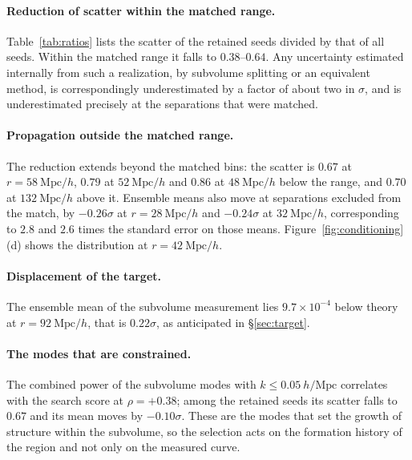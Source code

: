 \documentclass[12pt]{article}
\newcommand{\Mpch}{\ \mathrm{Mpc}/h}
\begin{document}
\paragraph{Reduction of scatter within the matched range.}
Table~\ref{tab:ratios} lists the scatter of the retained seeds divided by that
of all seeds.  Within the matched range it falls to $0.38$--$0.64$.  Any
uncertainty estimated internally from such a realization, by subvolume
splitting or an equivalent method, is correspondingly underestimated by a
factor of about two in $\sigma$, and is underestimated precisely at the
separations that were matched.

\paragraph{Propagation outside the matched range.}  The reduction extends
beyond the matched bins: the scatter is $0.67$ at $r = 58\Mpch$, $0.79$ at
$52\Mpch$ and $0.86$ at $48\Mpch$ below the range, and $0.70$ at $132\Mpch$
above it.  Ensemble means also move at separations excluded from the match, by
$-0.26\sigma$ at $r = 28\Mpch$ and $-0.24\sigma$ at $32\Mpch$, corresponding to
$2.8$ and $2.6$ times the standard error on those means.
Figure~\ref{fig:conditioning}(d) shows the distribution at $r = 42\Mpch$.

\paragraph{Displacement of the target.}  The ensemble mean of the subvolume
measurement lies $9.7\times10^{-4}$ below theory at $r = 92\Mpch$, that is
$0.22\sigma$, as anticipated in \S\ref{sec:target}.

\paragraph{The modes that are constrained.}  The combined power of the
subvolume modes with $k \leq 0.05\ h/\mathrm{Mpc}$ correlates with the search
score at $\rho = +0.38$; among the retained seeds its scatter falls to $0.67$
and its mean moves by $-0.10\sigma$.  These are the modes that set the growth
of structure within the subvolume, so the selection acts on the formation
history of the region and not only on the measured curve.
\end{document}
